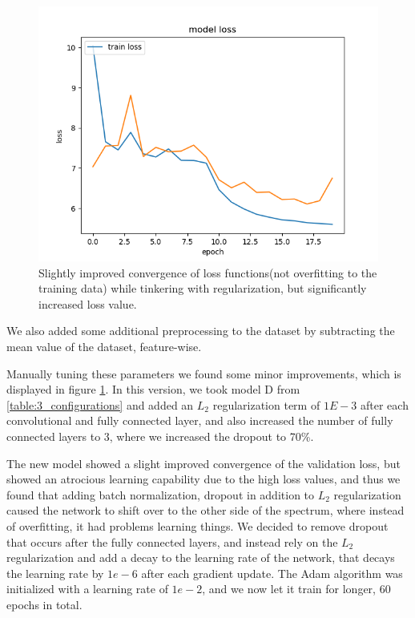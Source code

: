 \documentclass{kthreport}
\begin{document}
\begin{figure}
  \includegraphics[width=\linewidth]{../images/improved_loss_1.png}
  \caption[]
  {\small Slightly improved convergence of loss functions(not overfitting to the training data) while tinkering with regularization, but significantly increased loss value.}
  \label{fig:loss_improved_1}
\end{figure}
\FloatBarrier

We also added some additional preprocessing to the dataset by subtracting the mean value of the dataset, feature-wise.

Manually tuning these parameters we found some minor improvements, which is displayed in figure \ref{fig:loss_improved_1}. In this version, we took model D from \ref{table:3_configurations} and added an $L_{2}$ regularization term of $1E-3$ after each convolutional and fully connected layer, and also increased the number of fully connected layers to 3, where we increased the dropout to 70\%.


The new model showed a slight improved convergence of the validation loss, but showed an atrocious learning capability due to the high loss values, and thus we found that adding batch normalization, dropout in addition to $L_{2}$ regularization caused the network to shift over to the other side of the spectrum, where instead of overfitting, it had problems learning things. We decided to remove dropout that occurs after the fully connected layers, and instead rely on the $L_{2}$ regularization and add a decay to the learning rate of the network, that decays the learning rate by $1e-6$ after each gradient update. The Adam algorithm was initialized with a learning rate of $1e-2$, and we now let it train for longer, 60 epochs in total.
\end{document}

